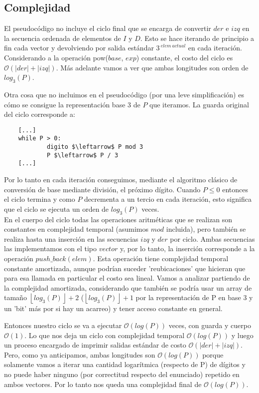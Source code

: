 \newpage
\subsection{Complejidad}
	El pseudocódigo no incluye el ciclo final que se encarga de convertir $der$ e $izq$ en la secuencia ordenada de elementos de $I$ y $D$. Esto se hace iterando de principio a fin cada vector y devolviendo por salida estándar $3^{\ elem \ actual}$ en cada iteración. Considerando a la operación pow($base$, $exp$) constante, el costo del ciclo es $\mathcal{O} (|der| + |izq|)$. Más adelante vamos a ver que ambas longitudes son orden de $log_3(P)$.
	
	Otra cosa que no incluimos en el pseudocódigo (por una leve simplificación) es cómo se consigue la representación base 3 de $P$ que iteramos. La guarda original del ciclo corresponde a:
	
	\begin{lstlisting}
	[...]
	while P > 0:
        	digito $\leftarrow$ P mod 3
        	P $\leftarrow$ P / 3
	[...]
	\end{lstlisting}
	
	Por lo tanto en cada iteración conseguimos, mediante el algoritmo clásico de conversión de base mediante división, el próximo dígito. Cuando $P \leq 0$ entonces el ciclo termina y como $P$ decrementa a un tercio en cada iteración, esto significa que el ciclo se ejecuta un orden de $log_3(P)$ veces. 
	\\
	
	En el cuerpo del ciclo todas las operaciones aritméticas que se realizan son constantes en complejidad temporal (asumimos $mod$ incluida), pero también se realiza hasta una inserción en las secuencias $izq$ y $der$ por ciclo. Ambas secuencias las implementamos con el tipo $vector$ y, por lo tanto, la inserción corresponde a la operación $push\_back(elem)$. Esta operación tiene complejidad temporal constante amortizada, aunque podrían suceder 'reubicaciones' que hicieran que para esa llamada en particular el costo sea lineal. Vamos a analizar partiendo de la complejidad amortizada, considerando que también se podría usar un array de tamaño $\left \lfloor{log_3(P)}\right \rfloor + 2$ ($\left \lfloor{log_3(P)}\right \rfloor + 1$ por la representación de P en base 3 y un 'bit' más por si hay un acarreo) y tener acceso constante en general.
	
	Entonces nuestro ciclo se va a ejecutar $\mathcal{O} (log(P))$ veces, con guarda y cuerpo $\mathcal{O} (1)$. Lo que nos deja un ciclo con complejidad temporal $\mathcal{O} (log(P))$ y luego un proceso encargado de imprimir salidas estándar de costo $\mathcal{O} (|der| + |izq|)$. Pero, como ya anticipamos, ambas longitudes son $\mathcal{O} (log(P))$ porque solamente vamos a iterar una cantidad logarítmica (respecto de P) de dígitos y no puede haber ninguno (por correctitud respecto del enunciado) repetido en ambos vectores. Por lo tanto nos queda una complejidad final de $\mathcal{O} (log(P))$.
	\\
	
